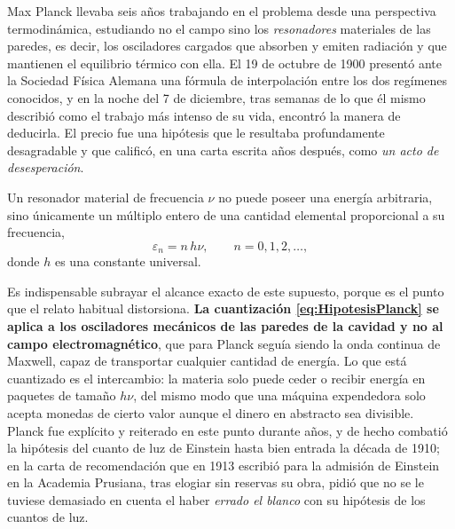             Max Planck llevaba seis años trabajando en el problema desde una perspectiva termodinámica, estudiando no el campo sino los \textit{resonadores} materiales de las paredes, es decir, los osciladores cargados que absorben y emiten radiación y que mantienen el equilibrio térmico con ella. El 19 de octubre de 1900 presentó ante la Sociedad Física Alemana una fórmula de interpolación entre los dos regímenes conocidos, y en la noche del 7 de diciembre, tras semanas de lo que él mismo describió como el trabajo más intenso de su vida, encontró la manera de deducirla. El precio fue una hipótesis que le resultaba profundamente desagradable y que calificó, en una carta escrita años después, como \textit{un acto de desesperación}.

            \begin{Assumption}\label{sup:Planck}
                Un resonador material de frecuencia $\nu$ no puede poseer una energía arbitraria, sino únicamente un múltiplo entero de una cantidad elemental proporcional a su frecuencia,
                \begin{equation}\label{eq:HipotesisPlanck}
                    \varepsilon_{n} = n\,h\nu, \qquad n = 0,1,2,\ldots,
                \end{equation}
                donde $h$ es una constante universal.
            \end{Assumption}

            Es indispensable subrayar el alcance exacto de este supuesto, porque es el punto que el relato habitual distorsiona. \textbf{La cuantización \eqref{eq:HipotesisPlanck} se aplica a los osciladores mecánicos de las paredes de la cavidad y no al campo electromagnético}, que para Planck seguía siendo la onda continua de Maxwell, capaz de transportar cualquier cantidad de energía. Lo que está cuantizado es el intercambio: la materia solo puede ceder o recibir energía en paquetes de tamaño $h\nu$, del mismo modo que una máquina expendedora solo acepta monedas de cierto valor aunque el dinero en abstracto sea divisible. Planck fue explícito y reiterado en este punto durante años, y de hecho combatió la hipótesis del cuanto de luz de Einstein hasta bien entrada la década de 1910; en la carta de recomendación que en 1913 escribió para la admisión de Einstein en la Academia Prusiana, tras elogiar sin reservas su obra, pidió que no se le tuviese demasiado en cuenta el haber \textit{errado el blanco} con su hipótesis de los cuantos de luz.

